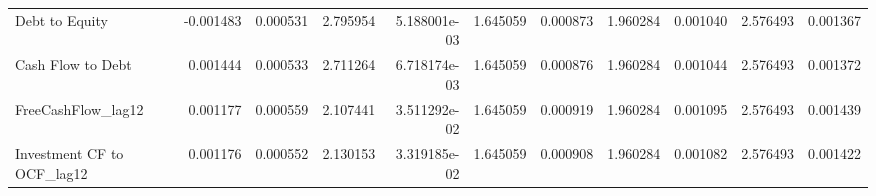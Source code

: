 \documentclass[12pt,a4paper,english]{article}
\begin{document}
{{\begin{tabular}{@{}lrrrrrrrrrr@{}}
			Debt to Equity                 & -0.001483                & 0.000531                    & 2.795954                  & 5.188001e-03                             & 1.645059                      & 0.000873                      & 1.960284                     & 0.001040                     & 2.576493                     & 0.001367                     \\
			Cash Flow to Debt              & 0.001444                 & 0.000533                    & 2.711264                  & 6.718174e-03                             & 1.645059                      & 0.000876                      & 1.960284                     & 0.001044                     & 2.576493                     & 0.001372                     \\
			FreeCashFlow\_lag12            & 0.001177                 & 0.000559                    & 2.107441                  & 3.511292e-02                             & 1.645059                      & 0.000919                      & 1.960284                     & 0.001095                     & 2.576493                     & 0.001439                     \\
			Investment CF to OCF\_lag12    & 0.001176                 & 0.000552                    & 2.130153                  & 3.319185e-02                             & 1.645059                      & 0.000908                      & 1.960284                     & 0.001082                     & 2.576493                     & 0.001422                     \\ \bottomrule
		\end{tabular}%
	}
}
\end{document}
